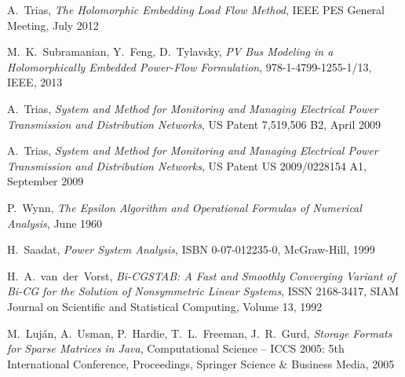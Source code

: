 \begin{thebibliography}{1}
	A.~Trias, \emph{The Holomorphic Embedding Load Flow Method}, IEEE PES General Meeting, July 2012
	
	M.~K.~Subramanian, Y.~Feng, D.~Tylavsky, \emph{PV Bus Modeling in a Holomorphically Embedded Power-Flow Formulation}, 978-1-4799-1255-1/13, IEEE, 2013
	
	A.~Trias, \emph{System and Method for Monitoring and Managing Electrical Power Transmission and Distribution Networks}, US Patent 7,519,506 B2, April 2009
	
	A.~Trias, \emph{System and Method for Monitoring and Managing Electrical Power Transmission and Distribution Networks}, US Patent US 2009/0228154 A1, September 2009
				
	P.~Wynn, \emph{The Epsilon Algorithm and Operational Formulas of Numerical Analysis}, June 1960	
	

	
	H.~Saadat, \emph{Power System Analysis}, ISBN 0-07-012235-0, McGraw-Hill, 1999
	
	H.~A.~van~der~Vorst, \emph{Bi-CGSTAB: A Fast and Smoothly Converging Variant of Bi-CG for the Solution of Nonsymmetric Linear Systems}, ISSN 2168-3417, SIAM Journal on Scientific and Statistical Computing, Volume 13, 1992
	
	M.~Luján, A.~Usman, P.~Hardie, T.~L.~Freeman, J.~R.~Gurd, \emph{Storage Formats for Sparse Matrices in Java}, Computational Science -- ICCS 2005: 5th International Conference, Proceedings, Springer Science \& Business Media, 2005
\end{thebibliography}